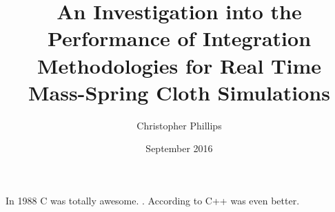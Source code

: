 \documentclass{surreydissertation}
\title{An Investigation into the Performance of Integration Methodologies for Real Time Mass-Spring Cloth Simulations}
\author{Christopher Phillips}
\date{September 2016}
\begin{document}
\maketitle



\tableofcontents
\listoffigures
\listoftables
%
%

%

%
%
%
%
%

In 1988 C was totally awesome. \parencites[1]{Yalcn}[4]{Provot2001}.
According to \textcite{Miguel2012} C++ was even better.

\appendix


\printbibliography[title=References,category=cited]
\printbibliography[title=Bibliography]
\end{document}
